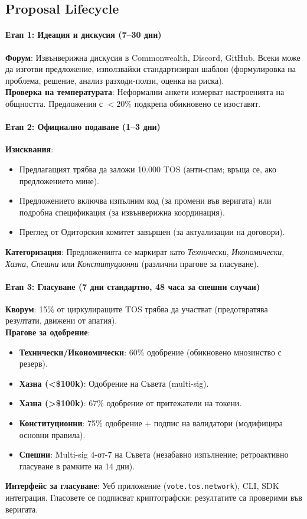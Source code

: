 \documentclass[11pt]{article}
\begin{document}
\subsection{Proposal Lifecycle}

\paragraph{Етап 1: Идеация и дискусия (7--30 дни)}
\textbf{Форум}: Извънверижна дискусия в Commonwealth, Discord, GitHub. Всеки може да изготви предложение, използвайки стандартизиран шаблон (формулировка на проблема, решение, анализ разходи-ползи, оценка на риска).\\
\textbf{Проверка на температурата}: Неформални анкети измерват настроенията на общността. Предложения с $<20\%$ подкрепа обикновено се изоставят.

\paragraph{Етап 2: Официално подаване (1--3 дни)}
\textbf{Изисквания}:
\begin{itemize}[noitemsep]
  \item Предлагащият трябва да заложи 10.000 TOS (анти-спам; връща се, ако предложението мине).
  \item Предложението включва изпълним код (за промени във веригата) или подробна спецификация (за извънверижна координация).
  \item Преглед от Одиторския комитет завършен (за актуализации на договори).
\end{itemize}
\textbf{Категоризация}: Предложенията се маркират като \emph{Технически}, \emph{Икономически}, \emph{Хазна}, \emph{Спешни} или \emph{Конституционни} (различни прагове за гласуване).

\paragraph{Етап 3: Гласуване (7 дни стандартно, 48 часа за спешни случаи)}
\textbf{Кворум}: 15\% от циркулиращите TOS трябва да участват (предотвратява резултати, движени от апатия).\\
\textbf{Прагове за одобрение}:
\begin{itemize}[noitemsep]
  \item \textbf{Технически/Икономически}: 60\% одобрение (обикновено мнозинство с резерв).
  \item \textbf{Хазна (<\$100k)}: Одобрение на Съвета (multi-sig).
  \item \textbf{Хазна (>\$100k)}: 67\% одобрение от притежатели на токени.
  \item \textbf{Конституционни}: 75\% одобрение + подпис на валидатори (модифицира основни правила).
  \item \textbf{Спешни}: Multi-sig 4-от-7 на Съвета (незабавно изпълнение; ретроактивно гласуване в рамките на 14 дни).
\end{itemize}
\textbf{Интерфейс за гласуване}: Уеб приложение (\texttt{vote.tos.network}), CLI, SDK интеграция. Гласовете се подписват криптографски; резултатите са проверими във веригата.
\end{document}
